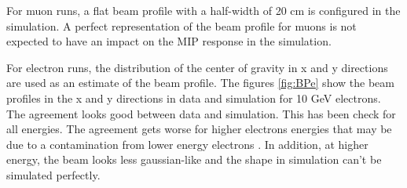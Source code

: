 For muon runs, a flat beam profile with a half-width of 20 cm is configured in the simulation. A perfect representation of the beam profile for muons is not expected to have an impact on the MIP response in the simulation.

For electron runs, the distribution of the center of gravity in x and y directions are used as an estimate of the beam profile. The figures \ref{fig:BPe} show the beam profiles in the x and y directions in data and simulation for 10 GeV electrons. The agreement looks good between data and simulation. This has been check for all energies. The agreement gets worse for higher electrons energies that may be due to a contamination from lower energy electrons \cite{AmbraEnergy}. In addition, at higher energy, the beam looks less gaussian-like and the shape in simulation can't be simulated perfectly.

